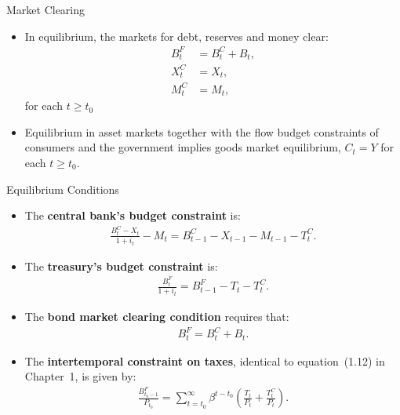 \documentclass[11pt,aspectratio=169]{beamer}
\begin{document}
\begin{frame}{Market Clearing}
\begin{itemize}
    \item In equilibrium, the markets for debt, reserves and money clear: 
\begin{align}
    B_t^F &= B_t^C + B_t, \label{2.13} \\
    X_t^C &= X_t, \label{2.14} \\
    M_t^C &= M_t \label{2.15},    
\end{align}
for each $t \ge t_0$
\vspace{0.25cm}
\item Equilibrium in asset markets together with the flow budget constraints of consumers and the government implies goods market equilibrium, $C_t = Y$ for each $t \ge t_0$.
\end{itemize}
\end{frame}

\begin{frame}{Equilibrium Conditions}
\small
\begin{itemize}

    \item The \textbf{central bank’s budget constraint} is:
    \begin{align}
        \frac{B_t^C - X_t}{1 + i_t} - M_t 
        = B_{t-1}^C - X_{t-1} - M_{t-1} - T_{t}^C.
        \label{2.16}
    \end{align}

    \item The \textbf{treasury’s budget constraint} is:
    \begin{align}
        \frac{B_t^F}{1+i_t} 
        = B_{t-1}^F - T_t - T_t^C.
        \label{2.17}
    \end{align}

    \item The \textbf{bond market clearing condition} requires that:
    \begin{align}
        B_t^F = B_t^C + B_t.
        \label{2.18}
    \end{align}

    \item The \textbf{intertemporal constraint on taxes}, identical to equation~(1.12) in Chapter~1, is given by:
    \begin{align}
        \frac{B_{t_0-1}^F}{P_{t_0}} 
        = \sum_{t=t_0}^\infty \beta^{t-t_0} 
        \left( 
            \frac{T_t}{P_t} + \frac{T_t^C}{P_t} 
        \right).
        \label{2.19}
    \end{align}

\end{itemize}
\end{frame}
\end{document}
